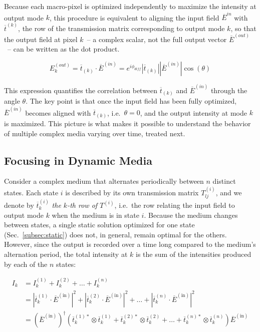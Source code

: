\documentclass[11pt, twoside]{article}
\begin{document}
Because each macro-pixel is optimized independently to maximize the intensity at output mode $k$, this procedure is equivalent to aligning the input field $\overline{E}^{in}$ with $\overline{t}^{(k)}$, the row of the transmission matrix corresponding to output mode $k$, so that the output field at pixel $k$~-- a complex scalar, not the full output vector $\overline{E}^{(out)}$~-- can be written as the dot product.

\begin{equation}
    E_k^{(out)} = \overline{t}_{(k)} \cdot \overline{E}^{(in)} = e^{i \phi_{diff}} |\overline{t}_{(k)}| |\overline{E}^{(in)}| \cos (\theta)
    \label{eq:correlation}
\end{equation}

This expression quantifies the correlation between $\overline{t}_{(k)}$ and $\overline{E}^{(in)}$ through the angle $\theta$. The key point is that once the input field has been fully optimized, $\overline{E}^{(in)}$ becomes aligned with $\overline{t}_{(k)}$, i.e.\ $\theta = 0$, and the output intensity at mode $k$ is maximized. This picture is what makes it possible to understand the behavior of multiple complex media varying over time, treated next.

\subsection{Focusing in Dynamic Media}
\label{subsec:dynamic}

Consider a complex medium that alternates periodically between $n$ distinct states. Each state $i$ is described by its own transmission matrix $T^{(i)}_{lj}$, and we denote by $\overline{t}^{(i)}_k$ \emph{the $k$-th row of $T^{(i)}$}, i.e.\ the row relating the input field to output mode $k$ when the medium is in state $i$. Because the medium changes between states, a single static solution optimized for one state (Sec.~\ref{subsec:static}) does not, in general, remain optimal for the others. However, since the output is recorded over a time long compared to the medium's alternation period, the total intensity at $k$ is the sum of the intensities produced by each of the $n$ states:

\begin{equation}
\begin{split}
    I_k &= I^{(1)}_k + I^{(2)}_k + \dots + I^{(n)}_k \\
        &= |\overline{t}^{(1)}_k \cdot \overline{E}^{(\text{in})}|^2 + |\overline{t}^{(2)}_k \cdot \overline{E}^{(\text{in})}|^2 + \dots + |\overline{t}^{(n)}_k \cdot \overline{E}^{(\text{in})}|^2 \\
        &= (\overline{E}^{(\text{in})})^\dagger \left( \overline{t}^{(1)*}_k \otimes \overline{t}^{(1)}_k + \overline{t}^{(2)*}_k \otimes \overline{t}^{(2)}_k + \dots + \overline{t}^{(n)*}_k \otimes \overline{t}^{(n)}_k \right) \overline{E}^{(\text{in})}
\end{split}
\label{eq:DCM_intensity_derivation}
\end{equation}
\end{document}
